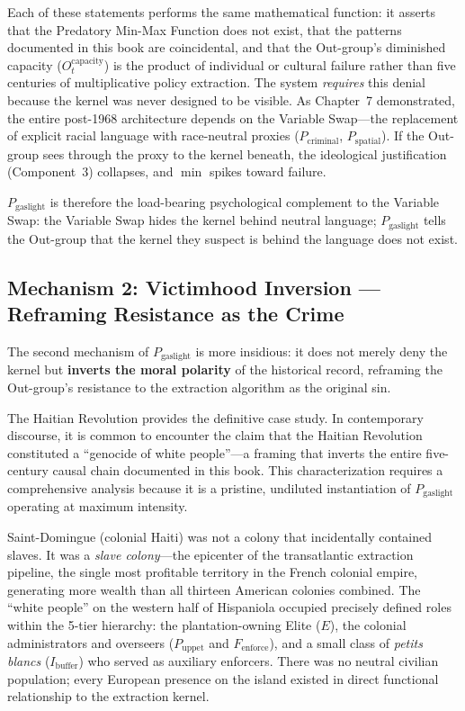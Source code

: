 \documentclass[12pt,openany]{book}
\begin{document}
Each of these statements performs the same mathematical function: it asserts that the Predatory Min-Max Function does not exist, that the patterns documented in this book are coincidental, and that the Out-group's diminished capacity ($O_t^{\text{capacity}}$) is the product of individual or cultural failure rather than five centuries of multiplicative policy extraction. The system \textit{requires} this denial because the kernel was never designed to be visible. As Chapter~7 demonstrated, the entire post-1968 architecture depends on the Variable Swap---the replacement of explicit racial language with race-neutral proxies ($P_{\text{criminal}}$, $P_{\text{spatial}}$). If the Out-group sees through the proxy to the kernel beneath, the ideological justification (Component~3) collapses, and $\min$ spikes toward failure.

$P_{\text{gaslight}}$ is therefore the load-bearing psychological complement to the Variable Swap: the Variable Swap hides the kernel behind neutral language; $P_{\text{gaslight}}$ tells the Out-group that the kernel they suspect is behind the language does not exist.

\subsection{Mechanism 2: Victimhood Inversion --- Reframing Resistance as the Crime}

The second mechanism of $P_{\text{gaslight}}$ is more insidious: it does not merely deny the kernel but \textbf{inverts the moral polarity} of the historical record, reframing the Out-group's resistance to the extraction algorithm as the original sin.

The Haitian Revolution provides the definitive case study. In contemporary discourse, it is common to encounter the claim that the Haitian Revolution constituted a ``genocide of white people''---a framing that inverts the entire five-century causal chain documented in this book. This characterization requires a comprehensive analysis because it is a pristine, undiluted instantiation of $P_{\text{gaslight}}$ operating at maximum intensity.

Saint-Domingue (colonial Haiti) was not a colony that incidentally contained slaves. It was a \textit{slave colony}---the epicenter of the transatlantic extraction pipeline, the single most profitable territory in the French colonial empire, generating more wealth than all thirteen American colonies combined. The ``white people'' on the western half of Hispaniola occupied precisely defined roles within the 5-tier hierarchy: the plantation-owning Elite ($E$), the colonial administrators and overseers ($P_{\text{uppet}}$ and $F_{\text{enforce}}$), and a small class of \textit{petits blancs} ($I_{\text{buffer}}$) who served as auxiliary enforcers. There was no neutral civilian population; every European presence on the island existed in direct functional relationship to the extraction kernel.
\end{document}
